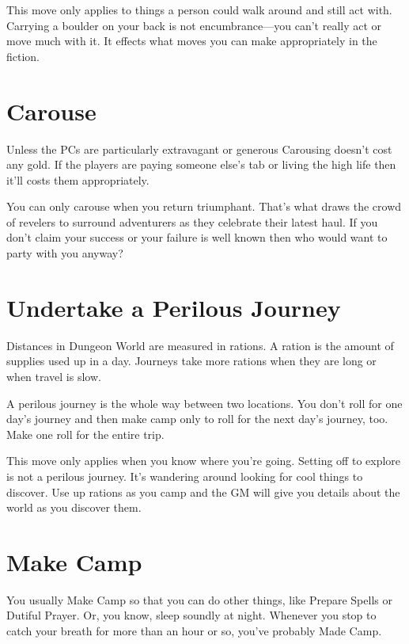  

This move only applies to things a person could walk around and still act with. Carrying a boulder on your back is not encumbrance—you can't really act or move much with it. It effects what moves you can make appropriately in the fiction.

 
\section{Carouse}   
 

Unless the PCs are particularly extravagant or generous Carousing doesn't cost any gold. If the players are paying someone else's tab or living the high life then it'll costs them appropriately.

 

You can only carouse when you return triumphant. That's what draws the crowd of revelers to surround adventurers as they celebrate their latest haul. If you don't claim your success or your failure is well known then who would want to party with you anyway?

 
\section{Undertake a Perilous Journey}     
 

Distances in Dungeon World are measured in rations. A ration is the amount of supplies used up in a day. Journeys take more rations when they are long or when travel is slow.

 

A perilous journey is the whole way between two locations. You don't roll for one day's journey and then make camp only to roll for the next day's journey, too. Make one roll for the entire trip.

 

This move only applies when you know where you're going. Setting off to explore is not a perilous journey. It's wandering around looking for cool things to discover. Use up rations as you camp and the GM will give you details about the world as you discover them.

 
\section{Make Camp}   
 

You usually Make Camp so that you can do other things, like Prepare Spells or Dutiful Prayer. Or, you know, sleep soundly at night. Whenever you stop to catch your breath for more than an hour or so, you've probably Made Camp.

